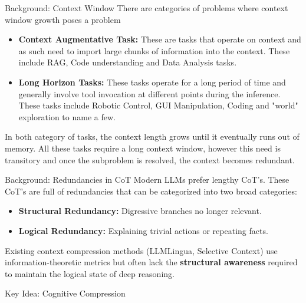 \documentclass[final]{beamer}
\newlength{\colwidth}
\begin{document}
\begin{frame}[t]
\begin{columns}[t]
\begin{column}{\colwidth}
  \begin{block}{Background: Context Window}
    There are categories of problems where context window growth poses a problem
    \begin{itemize}
        \item \textbf{Context Augmentative Task:} These are tasks that operate on context and as such need to import large chunks of information into the context. These include RAG, Code understanding and Data Analysis tasks.
        \item \textbf{Long Horizon Tasks:} These tasks operate for a long period of time and generally involve tool invocation at different points during the inference. These tasks include Robotic Control, GUI Manipulation, Coding and "world" exploration to name a few.
    \end{itemize}
    
    In both category of tasks, the context length grows until it eventually runs out of memory. All these tasks require a long context window, however this need is transitory and once the subproblem is resolved, the context becomes redundant.
    \end{block}
  
    \begin{block}{Background: Redundancies in CoT}
        Modern LLMs prefer lengthy CoT's. These CoT's are full of redundancies that can be categorized into two broad categories:
        \begin{itemize}
            \item \textbf{Structural Redundancy:} Digressive branches no longer relevant.
            \item \textbf{Logical Redundancy:} Explaining trivial actions or repeating facts.
        \end{itemize}
        
        Existing context compression methods (LLMLingua, Selective Context) use information-theoretic metrics but often lack the \textbf{structural awareness} required to maintain the logical state of deep reasoning.
    \end{block}

  \begin{alertblock}{Key Idea: Cognitive Compression}


\end{alertblock}
\end{column}
\end{columns}
\end{frame}
\end{document}
